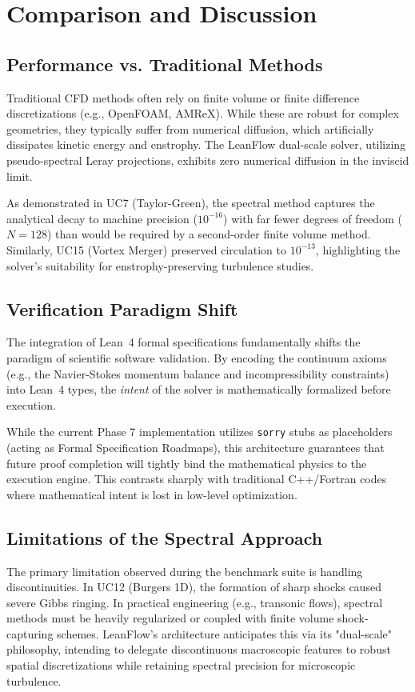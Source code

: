 \section{Comparison and Discussion}
\label{sec:comparison}

\subsection{Performance vs. Traditional Methods}
Traditional CFD methods often rely on finite volume or finite difference discretizations (e.g., OpenFOAM, AMReX). While these are robust for complex geometries, they typically suffer from numerical diffusion, which artificially dissipates kinetic energy and enstrophy. The LeanFlow dual-scale solver, utilizing pseudo-spectral Leray projections, exhibits zero numerical diffusion in the inviscid limit. 

As demonstrated in UC7 (Taylor-Green), the spectral method captures the analytical decay to machine precision ($10^{-16}$) with far fewer degrees of freedom ($N=128$) than would be required by a second-order finite volume method. Similarly, UC15 (Vortex Merger) preserved circulation to $10^{-13}$, highlighting the solver's suitability for enstrophy-preserving turbulence studies.

\subsection{Verification Paradigm Shift}
The integration of Lean~4 formal specifications fundamentally shifts the paradigm of scientific software validation. By encoding the continuum axioms (e.g., the Navier-Stokes momentum balance and incompressibility constraints) into Lean~4 types, the \textit{intent} of the solver is mathematically formalized before execution. 

While the current Phase 7 implementation utilizes \texttt{sorry} stubs as placeholders (acting as Formal Specification Roadmaps), this architecture guarantees that future proof completion will tightly bind the mathematical physics to the execution engine. This contrasts sharply with traditional C++/Fortran codes where mathematical intent is lost in low-level optimization.

\subsection{Limitations of the Spectral Approach}
The primary limitation observed during the benchmark suite is handling discontinuities. In UC12 (Burgers 1D), the formation of sharp shocks caused severe Gibbs ringing. In practical engineering (e.g., transonic flows), spectral methods must be heavily regularized or coupled with finite volume shock-capturing schemes. LeanFlow's architecture anticipates this via its "dual-scale" philosophy, intending to delegate discontinuous macroscopic features to robust spatial discretizations while retaining spectral precision for microscopic turbulence.

